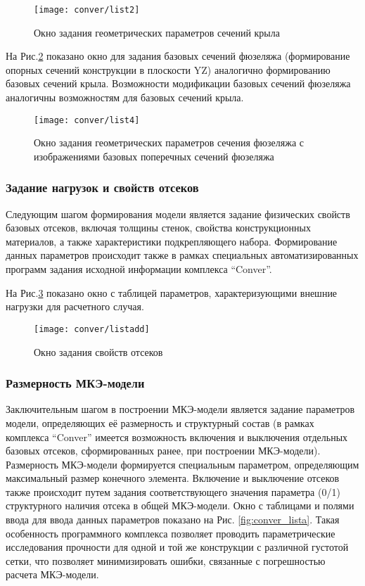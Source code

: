 \begin{figure}[H]
\centering
\texttt{[image: conver/list2]}
\caption{Окно задания геометрических параметров сечений крыла}
\label{fig:conver_list2}
\end{figure} 

На Рис.\ref{fig:conver_list4} показано окно для задания базовых сечений фюзеляжа (формирование опорных сечений конструкции в плоскости YZ)  аналогично формированию базовых сечений крыла. Возможности модификации базовых сечений фюзеляжа аналогичны возможностям для базовых сечений крыла.

\begin{figure}[H]
\centering
\captionsetup{justification=centering}
\texttt{[image: conver/list4]}
\caption{Окно задания геометрических параметров сечения фюзеляжа с изображениями базовых поперечных сечений фюзеляжа}
\label{fig:conver_list4}
\end{figure}

\subsubsection{Задание нагрузок и свойств отсеков}

Следующим шагом формирования модели является задание физических свойств базовых отсеков, включая толщины стенок, свойства конструкционных материалов, а также характеристики подкрепляющего набора. Формирование данных параметров происходит также в рамках специальных автоматизированных  программ задания исходной информации комплекса ``Conver''.

На Рис.\ref{fig:conver_listadd} показано окно с таблицей параметров, характеризующими внешние нагрузки для расчетного случая.


\begin{figure}[H]
\centering
\texttt{[image: conver/listadd]}
\caption{Окно задания свойств отсеков}
\label{fig:conver_listadd}
\end{figure}

\subsubsection{Размерность МКЭ-модели}

Заключительным шагом в построении МКЭ-модели является задание параметров модели, определяющих её размерность и структурный состав (в рамках комплекса ``Conver'' имеется возможность включения и выключения отдельных базовых отсеков, сформированных ранее, при построении МКЭ-модели). Размерность МКЭ-модели формируется специальным параметром, определяющим максимальный размер конечного элемента. Включение и выключение отсеков также происходит путем задания соответствующего значения параметра (0/1) структурного наличия отсека в общей МКЭ-модели. Окно с таблицами и полями ввода для ввода данных параметров показано на Рис.
\ref{fig:conver_lista}.
Такая особенность программного комплекса позволяет проводить параметрические исследования прочности для одной и той же конструкции с различной густотой сетки, что позволяет минимизировать ошибки, связанные с погрешностью расчета МКЭ-модели. 

